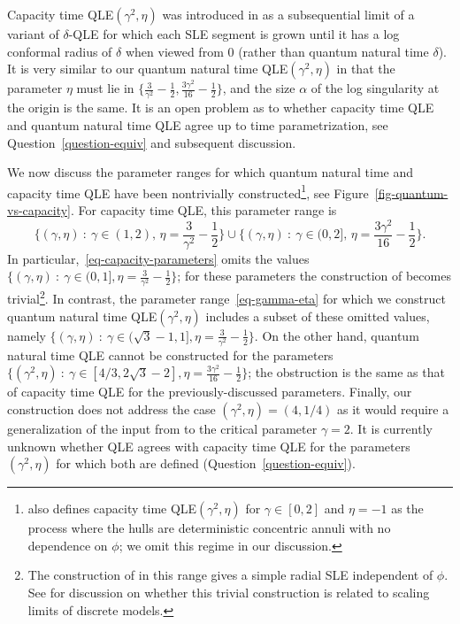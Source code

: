 \documentclass[a4paper]{article}
\numberwithin{equation}{section}
\newcommand{\eqb}{\begin{equation}}
\newcommand{\eqe}{\end{equation}}
\theoremstyle{remark}
\numberwithin{equation}{section}
\begin{document}
Capacity time QLE$(\gamma^2, \eta)$ was introduced in \cite{ms-qle} as a subsequential limit of a variant of $\delta$-QLE for which each SLE segment is grown until it has a log conformal radius of $\delta$ when viewed from 0 (rather than quantum natural time $\delta$). It is very similar to our quantum natural time QLE$(\gamma^2, \eta)$ in that the parameter $\eta$ must lie in $\{\frac{3}{\gamma^2}-\frac12, \frac{3\gamma^2}{16} - \frac12\}$, and the size $\alpha$ of the log singularity at the origin is the same. 
It is an open problem as to whether capacity time QLE and quantum natural time QLE agree up to time parametrization, see Question~\ref{question-equiv} and  subsequent discussion.

We now discuss the parameter ranges for which quantum natural time and capacity time QLE have been nontrivially constructed\footnote{\cite{ms-equivalence} also defines capacity time QLE$(\gamma^2, \eta)$ for $\gamma \in [0,2]$ and $\eta = -1$ as the process where the hulls are deterministic concentric annuli with no dependence on $\phi$; we omit this regime in our discussion.}, see Figure~\ref{fig-quantum-vs-capacity}. For capacity time QLE, this parameter range is 
\eqb \label{eq-capacity-parameters}
\{(\gamma, \eta) \: : \: \gamma \in (1,2), \, \eta = \frac{3}{\gamma^2} - \frac12\} \cup \{(\gamma, \eta) \: : \: \gamma \in (0, 2], \, \eta = \frac{3\gamma^2}{16} - \frac12\}.
\eqe
In particular,~\eqref{eq-capacity-parameters} omits the values $\{ (\gamma, \eta) \:: \:  \gamma \in (0 , 1], \eta = \frac{3}{\gamma^2} - \frac12\}$; for these parameters the construction of \cite{ms-qle} becomes trivial\footnote{The construction of \cite{ms-qle} in this range gives a simple radial SLE independent of $\phi$. See \cite[Section 1.5]{ms-equivalence} for discussion on whether this trivial construction is related to scaling limits of discrete models.}. In contrast, the parameter range~\eqref{eq-gamma-eta} for which we construct quantum natural time QLE$(\gamma^2, \eta)$ includes a subset of these omitted values, namely $\{ (\gamma, \eta) \:: \:  \gamma \in (\sqrt3-1 , 1], \eta = \frac{3}{\gamma^2} - \frac12\}$. On the other hand, quantum natural time QLE cannot be constructed for the parameters $\{ (\gamma^2, \eta) \: : \: \gamma \in [4/3, 2\sqrt3 - 2], \eta = \frac{3\gamma^2}{16} - \frac12\}$; the obstruction is the same as that of capacity time QLE for the previously-discussed parameters. Finally, our construction does not address the case $(\gamma^2, \eta) = (4, 1/4)$ as it would require a generalization of the input from \cite{ay-radial} to the critical parameter $\gamma = 2$. It is currently unknown whether QLE agrees with capacity time QLE for the parameters $(\gamma^2, \eta)$ for which both are defined (Question~\ref{question-equiv}). 
\end{document}
